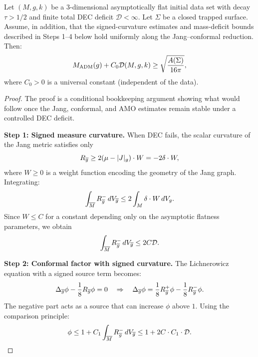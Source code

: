 \begin{theorem}\label{thm:ModifiedPenrose}
Let $(M, g, k)$ be a 3-dimensional asymptotically flat initial data set with decay $\tau > 1/2$ and finite total DEC deficit $\mathcal{D} < \infty$. Let $\Sigma$ be a closed trapped surface. Assume, in addition, that the signed-curvature estimates and mass-deficit bounds described in Steps 1--4 below hold uniformly along the Jang--conformal reduction. Then:
\begin{equation}\label{eq:ModifiedPenrose}
    M_{\mathrm{ADM}}(g) + C_0 \mathcal{D}(M,g,k) \ge \sqrt{\frac{A(\Sigma)}{16\pi}},
\end{equation}
where $C_0 > 0$ is a universal constant (independent of the data).
\end{theorem}

\begin{proof}
The proof is a conditional bookkeeping argument showing what would follow once the Jang, conformal, and AMO estimates remain stable under a controlled DEC deficit.

\textbf{Step 1: Signed measure curvature.}
When DEC fails, the scalar curvature of the Jang metric satisfies only
\begin{equation}
    R_{\overline{g}} \ge 2(\mu - |J|_g) \cdot W = -2\delta \cdot W,
\end{equation}
where $W \ge 0$ is a weight function encoding the geometry of the Jang graph. Integrating:
\begin{equation}
    \int_{\overline{M}} R_{\overline{g}}^- \, dV_{\overline{g}} \le 2 \int_M \delta \cdot W \, dV_g.
\end{equation}
Since $W \le C$ for a constant depending only on the asymptotic flatness parameters, we obtain
\begin{equation}
    \int_{\overline{M}} R_{\overline{g}}^- \, dV_{\overline{g}} \le 2C \mathcal{D}.
\end{equation}

\textbf{Step 2: Conformal factor with signed curvature.}
The Lichnerowicz equation with a signed source term becomes:
\begin{equation}
    \Delta_{\overline{g}} \phi - \frac{1}{8} R_{\overline{g}} \phi = 0 \quad \Rightarrow \quad \Delta_{\overline{g}} \phi = \frac{1}{8} R_{\overline{g}}^+ \phi - \frac{1}{8} R_{\overline{g}}^- \phi.
\end{equation}
The negative part acts as a source that can increase $\phi$ above $1$. Using the comparison principle:
\begin{equation}
    \phi \le 1 + C_1 \int_{\overline{M}} R_{\overline{g}}^- \, dV_{\overline{g}} \le 1 + 2C \cdot C_1 \cdot \mathcal{D}.
\end{equation}


\end{proof}
